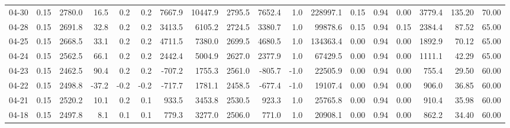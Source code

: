 \begin{threeparttable}
{\begin{tabular}{lrrrrrrrrrrrrrrrrr}
  04-30 &     0.15 & 2780.0 &              16.5 &               0.2 &                0.2 &             7667.9 & 10447.9 & 2795.5 &     7652.4 &                      1.0 &            228997.1 &       0.15 &      0.94 &           0.00 &           3779.4 &          135.20 &                  70.00 \\
  04-28 &     0.15 & 2691.8 &              32.8 &               0.2 &                0.2 &             3413.5 &  6105.2 & 2724.5 &     3380.7 &                      1.0 &             99878.6 &       0.15 &      0.94 &           0.15 &           2384.4 &           87.52 &                  65.00 \\
  04-25 &     0.15 & 2668.5 &              33.1 &               0.2 &                0.2 &             4711.5 &  7380.0 & 2699.5 &     4680.5 &                      1.0 &            134363.4 &       0.00 &      0.94 &           0.00 &           1892.9 &           70.12 &                  65.00 \\
  04-24 &     0.15 & 2562.5 &              66.1 &               0.2 &                0.2 &             2442.4 &  5004.9 & 2627.0 &     2377.9 &                      1.0 &             67429.5 &       0.00 &      0.94 &           0.00 &           1111.1 &           42.29 &                  65.00 \\
  04-23 &     0.15 & 2462.5 &              90.4 &               0.2 &                0.2 &             -707.2 &  1755.3 & 2561.0 &     -805.7 &                     -1.0 &             22505.9 &       0.00 &      0.94 &           0.00 &            755.4 &           29.50 &                  60.00 \\
  04-22 &     0.15 & 2498.8 &             -37.2 &              -0.2 &               -0.2 &             -717.7 &  1781.1 & 2458.5 &     -677.4 &                     -1.0 &             19107.4 &       0.00 &      0.94 &           0.00 &            906.0 &           36.85 &                  60.00 \\
  04-21 &     0.15 & 2520.2 &              10.1 &               0.2 &                0.1 &              933.5 &  3453.8 & 2530.5 &      923.3 &                      1.0 &             25765.8 &       0.00 &      0.94 &           0.00 &            910.4 &           35.98 &                  60.00 \\
  04-18 &     0.15 & 2497.8 &               8.1 &               0.1 &                0.1 &              779.3 &  3277.0 & 2506.0 &      771.0 &                      1.0 &             20908.1 &       0.00 &      0.94 &           0.00 &            862.2 &           34.40 &                  60.00 \\

\end{tabular}}
\end{threeparttable}
